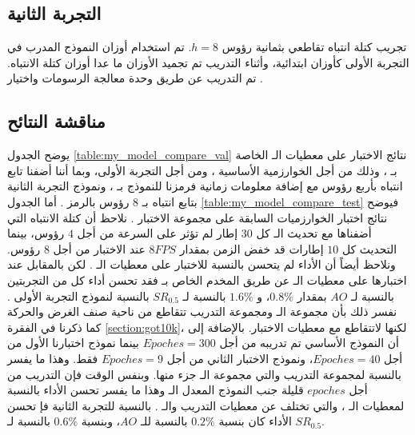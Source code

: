\subsection{التجربة الثانية}
تجريب كتلة انتباه تقاطعي بثمانية رؤوس
$h = 8$.
تم استخدام أوزان النموذج المدرب في التجربة الأولى كأوزان ابتدائية، وأثناء التدريب تم تجميد الأوزان ما عدا أوزان كتلة الانتباه.
تم التدريب عن طريق وحدة معالجة الرسومات 
واختيار 
.
\subsection{مناقشة النتائح}
يوضح الجدول
\ref{table:my_model_compare_val}
نتائج الاختبار على معطيات الـ
الخاصة بـ
،
وذلك من أجل الخوارزمية الأساسية 
،
ومن أجل التجربة الأولى، وبما أننا أضفنا تابع انتباه بأربع رؤوس مع إضافة معلومات زمانية فرمزنا للنموذج بـ
،
ونموذج التجربة الثانية بتابع انتباه بـ
$8$
رؤوس بالرمز
.
أما الجدول 
\ref{table:my_model_compare_test}
فيوضح نتائج اختبار الخوارزميات السابقة على مجموعة الاختبار 
.
\newline
نلاحظ أن كتلة الانتباه التي أضفناها مع تحديث الـ
كل 
$30$
إطار لم تؤثر على السرعة من أجل $4$ رؤوس، بينما التحديث كل 
$10$
إطارات قد خفض الزمن بمقدار 
$8FPS$
عند الاختبار من أجل
$8$
رؤوس.
ونلاحظ أيضاً أن الأداء لم يتحسن بالنسبة للاختبار على معطيات الـ
.
لكن بالمقابل عند اختبارها على معطيات الـ
عن طريق المخدم الخاص بـ
فقد تحسن أداء كل من التجربتين بالنسبة لـ
$AO$
بمقدار
$0.8\%$،
و
$1.6\%$
بالنسبة لـ
$SR_{0.5}$
بالنسبة لنموذج التجربة الأولى
.
نفسر ذلك بأن مجموعة الـ
ومجموعة التدريب تتقاطع من ناحية صنف الغرض والحركة كما ذكرنا في الفقرة
\ref{section:got10k}،
لكنها لاتتقاطع مع معطيات الاختبار.
بالإضافة إلى أن النموذج الأساسي تم تدريبه من أجل 
$Epoches = 300$
بينما نموذج اختبارنا الأول من أجل 
$Epoches = 40$،
ونموذج الاختبار الثاني من أجل 
$Epoches = 9$ 
فقط. وهذا ما يفسر 
بالنسبة لمجموعة التدريب والتي مجموعة الـ
جزء منها.
وبنفس الوقت فإن التدريب من أجل 
$epoches$
قليلة جنب النموذج المعدل الـ
وهذا ما يفسر تحسن الأداء بالنسبة لمعطيات الـ
،
والتي تختلف عن معطيات التدريب والـ
.
\newline
بالنسبة للتجربة الثانية فإ تحسن الأداء كان بنسبة 
$0.2\%$
بالنسبة للـ
$AO$،
وبنسبة 
$0.6\%$
بالنسبة لـ
$SR_{0.5}$.

